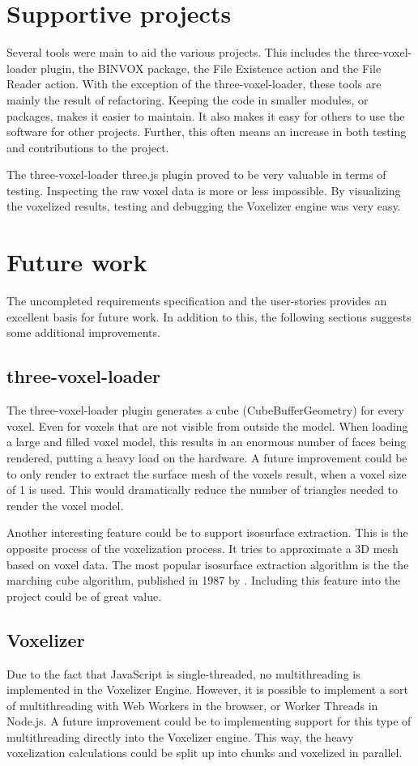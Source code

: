 \section{Supportive projects}
\label{sec:discussion-supportive-projects}
Several tools were main to aid the various projects. This includes the three-voxel-loader plugin, the BINVOX package, the File Existence action and the File Reader action. With the exception of the three-voxel-loader, these tools are mainly the result of refactoring. Keeping the code in smaller modules, or packages, makes it easier to maintain. It also makes it easy for others to use the software for other projects. Further, this often means an increase in both testing and contributions to the project.

The three-voxel-loader three.js plugin proved to be very valuable in terms of testing. Inspecting the raw voxel data is more or less impossible. By visualizing the voxelized results, testing and debugging the Voxelizer engine was very easy.

\section{Future work}
\label{sec:discussion-future-work}
The uncompleted requirements specification and the user-stories provides an excellent basis for future work. In addition to this, the following sections suggests some additional improvements.

\subsection{three-voxel-loader}
The three-voxel-loader plugin generates a cube (CubeBufferGeometry) for every voxel. Even for voxels that are not visible from outside the model. When loading a large and filled voxel model, this results in an enormous number of faces being rendered, putting a heavy load on the hardware. A future improvement could be to only render to extract the surface mesh of the voxels result, when a voxel size of 1 is used. This would dramatically reduce the number of triangles needed to render the voxel model.

Another interesting feature could be to support isosurface extraction. This is the opposite process of the voxelization process. It tries to approximate a 3D mesh based on voxel data. The most popular isosurface extraction algorithm is the the marching cube algorithm, published in 1987 by \citet{marching-cubes-cline-lorentsen}. Including this feature into the project could be of great value.

\subsection{Voxelizer}
Due to the fact that JavaScript is single-threaded, no multithreading is implemented in the Voxelizer Engine. However, it is possible to implement a sort of multithreading with Web Workers in the browser, or Worker Threads in Node.js. A future improvement could be to implementing support for this type of multithreading directly into the Voxelizer engine. This way, the heavy voxelization calculations could be split up into chunks and voxelized in parallel.
